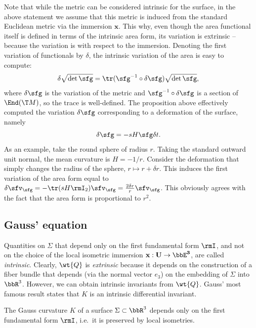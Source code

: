 \begin{rem}
    Note that while the metric can be considered intrinsic for the surface, in the above statement we assume that this metric is induced from the standard Euclidean metric via the immersion $\bm{x}$. This why, even though the area functional itself is defined in terms of the intrinsic area form, its variation is extrinsic -- because the variation is with respect to the immersion. Denoting the first variation of functionals by $\delta$, the intrinsic variation of the area is easy to compute:
    \[\delta \sqrt{\det\sfg}=\tr (\sfg^{-1}\circ \delta \sfg)\sqrt{\det\sfg},\]
    where $\delta\sfg$ is the variation of the metric and $\sfg^{-1}\circ \delta \sfg$ is a section of $\End(\T M)$, so the trace is well-defined. The proposition above effectively computed the variation $\delta\sfg$ corresponding to a deformation of the surface, namely 
    \[\delta\sfg=-sH\sfg\delta t.\]
    As an example, take the round sphere of radius $r$. Taking the standard outward unit normal, the mean curvature is $H=-1/r$. Consider the deformation that simply changes the radius of the sphere, $r\mapsto r+\delta r$. This induces the first variation of the area form equal to $\delta \sfv_{\sfg}=-\tr(sH \rmI_2)\sfv_{\sfg}=\frac{2\delta r}{r}\sfv_{\sfg}$. This obviously agrees with the fact that the area form is proportional to $r^2$.
\end{rem}











\subsection{Gauss' equation}


Quantities on $\Sigma$ that depend only on the first fundamental form $\rmI$, and not on the choice of the local isometric immersion $\bf{x}:U\to \bbE^3$, are called \emph{intrinsic}. Clearly, $\wt{Q}$ is \emph{extrinsic} because it depends on the construction of a fiber bundle that depends (via the normal vector $e_3$) on the embedding of $\Sigma$ into $\bbR^3$. However, we can obtain intrinsic invariants from $\wt{Q}$. Gauss' most famous result states that $K$ is an intrinsic differential invariant.

\begin{thm}\label{thm egregium}
    The Gauss curvature $K$ of a surface $\Sigma\subset\bbR^3$ depends only on the first fundamental form $\rmI$, i.e.\ it is preserved by local isometries.
\end{thm}

